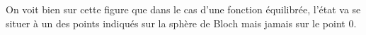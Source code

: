 




\medbreak

On voit bien sur cette figure que dans le cas d'une fonction équilibrée, l'état va se situer à un des points indiqués sur la sphère de Bloch mais jamais sur le point 0. 
